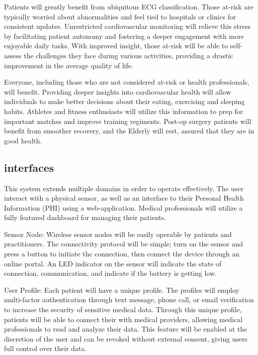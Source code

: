 \documentclass{article}
\begin{document}
Patients will greatly benefit from ubiquitous ECG classification. Those at-risk are typically worried about abnormalities and feel tied to hospitals or clinics for consistent updates. Unrestricted cardiovascular monitoring will relieve this stress by facilitating patient autonomy and fostering a deeper engagement with more enjoyable daily tasks. With improved insight, those at-risk will be able to self-assess the challenges they face during various activities, providing a drastic improvement in the average quality of life. 

Everyone, including those who are not considered at-risk or health professionals, will benefit. Providing deeper insights into cardiovascular health will allow individuals to make better decisions about their eating, exercising and sleeping habits. Athletes and fitness enthusiasts will utilize this information to prep for important matches and improve training regiments. Post-op surgery patients will benefit from smoother recovery, and the Elderly will rest, assured that they are in good health.

\subsection{\gls{interfaces}}
This system extends multiple domains in order to operate effectively. The user interact with a physical sensor, as well as an interface to their Personal Health Information (PHI) using a web-application. Medical professionals will utilize a fully featured dashboard for managing their patients.

Sensor Node: Wireless sensor nodes will be easily operable by patients and practitioners. The connectivity protocol will be simple; turn on the sensor and press a button to initiate the connection, then connect the device through an online portal. An LED indicator on the sensor will indicate the state of connection, communication, and indicate if the battery is getting low.

User Profile: Each patient will have a unique profile. The profiles will employ multi-factor authentication through text message, phone call, or email verification to increase the security of sensitive medical data. Through this unique profile, patients will be able to connect their with medical providers, allowing medical professionals to read and analyze their data. This feature will be enabled at the discretion of the user and can be revoked without external consent, giving users full control over their data. 
\end{document}
